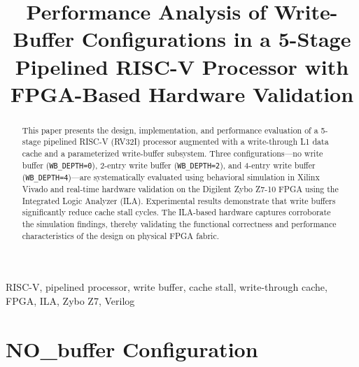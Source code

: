\documentclass[conference]{IEEEtran}
\begin{document}
\title{Performance Analysis of Write-Buffer Configurations in a 5-Stage Pipelined RISC-V Processor with FPGA-Based Hardware Validation}

\author{
\and
{}
}

\maketitle

\begin{abstract}
This paper presents the design, implementation, and performance evaluation of a 5-stage pipelined RISC-V (RV32I) processor augmented with a write-through L1 data cache and a parameterized write-buffer subsystem. Three configurations---no write buffer (\texttt{WB\_DEPTH=0}), 2-entry write buffer (\texttt{WB\_DEPTH=2}), and 4-entry write buffer (\texttt{WB\_DEPTH=4})---are systematically evaluated using behavioral simulation in Xilinx Vivado and real-time hardware validation on the Digilent Zybo Z7-10 FPGA using the Integrated Logic Analyzer (ILA). Experimental results demonstrate that write buffers significantly reduce cache stall cycles. The ILA-based hardware captures corroborate the simulation findings, thereby validating the functional correctness and performance characteristics of the design on physical FPGA fabric.
\end{abstract}

\begin{IEEEkeywords}
RISC-V, pipelined processor, write buffer, cache stall, write-through cache, FPGA, ILA, Zybo Z7, Verilog
\end{IEEEkeywords}

\section{NO\_buffer Configuration}
\label{sec:no_buffer}
\end{document}
